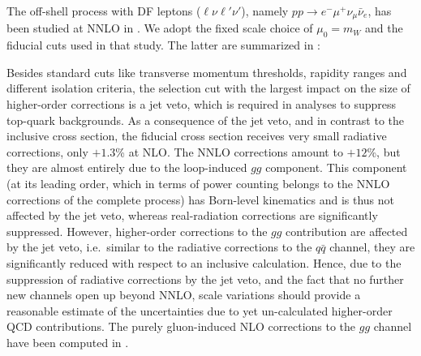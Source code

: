\documentclass[english,11pt]{article}
\begin{document}
The off-shell \ww{} process with DF leptons ($\ell\nu\ell'\nu'$), 
namely $pp \to e^- \mu^+ \nu_\mu \bar\nu_e$, has been studied 
at NNLO in . We adopt the fixed scale choice of $\mu_0=m_W$ 
and the fiducial cuts used in that study. The latter are summarized in :
%

%
Besides standard cuts like transverse momentum thresholds, rapidity ranges and 
different isolation criteria, the selection cut with the largest impact on the size of 
higher-order corrections is a jet veto, which is required in \ww{} analyses to suppress 
top-quark backgrounds. 
As a consequence of the jet veto, and in contrast 
to the inclusive \ww{} cross section, the fiducial cross section receives 
very small radiative corrections, only $+1.3$\% at NLO. The NNLO 
corrections amount to $+12$\%, but they are almost entirely due to the loop-induced $gg$ 
component.
This component (at its leading order, which in terms of power counting
belongs to the NNLO corrections of the complete process) has Born-level kinematics and is
thus not affected by the jet veto, whereas real-radiation corrections are significantly 
suppressed.
However, higher-order corrections to the $gg$ contribution
are affected by the jet veto, i.e.\ similar to the radiative corrections to the $q\bar{q}$ channel, they are significantly reduced with respect to an inclusive calculation.
Hence, due to the suppression of radiative corrections by the jet veto, 
and the fact that no further new channels 
open up beyond NNLO, scale variations should provide a reasonable estimate of the 
uncertainties due to yet un-calculated higher-order QCD contributions.
The purely gluon-induced NLO corrections to the $gg$ channel have been
computed in .
\end{document}
